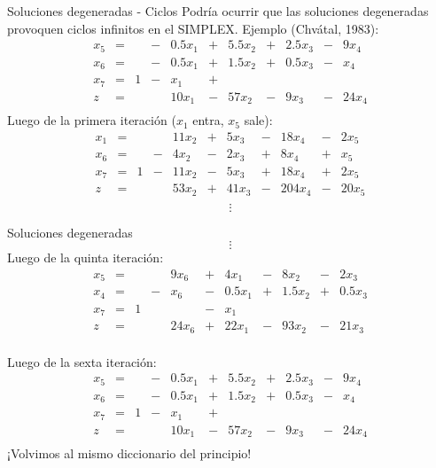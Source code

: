 \documentclass[10pt, aspectratio=169]{beamer}
\begin{document}
\begin{frame}{Soluciones degeneradas - Ciclos}
    Podría ocurrir que las soluciones degeneradas provoquen ciclos infinitos en el SIMPLEX. Ejemplo (Chvátal, 1983):
    \[
        \begin{array}{rrrrrrrrrrr}
            x_5 & = &   & - & 0.5x_1 & + & 5.5x_2 & + & 2.5x_3 & - & 9x_4  \\
            x_6 & = &   & - & 0.5x_1 & + & 1.5x_2 & + & 0.5x_3 & - & x_4   \\
            x_7 & = & 1 & - & x_1    & + &        &   &        &   &       \\ \hline
            z   & = &   &   & 10x_1  & - & 57x_2  & - & 9x_3   & - & 24x_4 \\
        \end{array}
    \]
    Luego de la primera iteración ($x_1$ entra, $x_5$ sale):
    \[
        \begin{array}{rrrrrrrrrrr}
            x_1 & = &   &   & 11x_2 & + & 5x_3  & - & 18x_4  & - & 2x_5  \\
            x_6 & = &   & - & 4x_2  & - & 2x_3  & + & 8x_4   & + & x_5   \\
            x_7 & = & 1 & - & 11x_2 & - & 5x_3  & + & 18x_4  & + & 2x_5  \\ \hline
            z   & = &   &   & 53x_2 & + & 41x_3 & - & 204x_4 & - & 20x_5 \\
        \end{array}
    \]
    \large
    \[ \mathbf{\vdots} \]
\end{frame}

\begin{frame}{Soluciones degeneradas}
    \[\mathbf{\vdots}\]
    Luego de la quinta iteración:
    \[
        \begin{array}{rrrrrrrrrrr}
            x_5 & = &   &   & 9x_6  & + & 4x_1   & - & 8x_2   & - & 2x_3   \\
            x_4 & = &   & - & x_6   & - & 0.5x_1 & + & 1.5x_2 & + & 0.5x_3 \\
            x_7 & = & 1 &   &       & - & x_1    &   &        &   &        \\ \hline
            z   & = &   &   & 24x_6 & + & 22x_1  & - & 93x_2  & - & 21x_3  \\
        \end{array}
    \]

    Luego de la sexta iteración:
    \[
        \begin{array}{rrrrrrrrrrr}
            x_5 & = &   & - & 0.5x_1 & + & 5.5x_2 & + & 2.5x_3 & - & 9x_4  \\
            x_6 & = &   & - & 0.5x_1 & + & 1.5x_2 & + & 0.5x_3 & - & x_4   \\
            x_7 & = & 1 & - & x_1    & + &        &   &        &   &       \\ \hline
            z   & = &   &   & 10x_1  & - & 57x_2  & - & 9x_3   & - & 24x_4 \\
        \end{array}
    \]
    ¡Volvimos al mismo diccionario del principio!
\end{frame}
\end{document}
